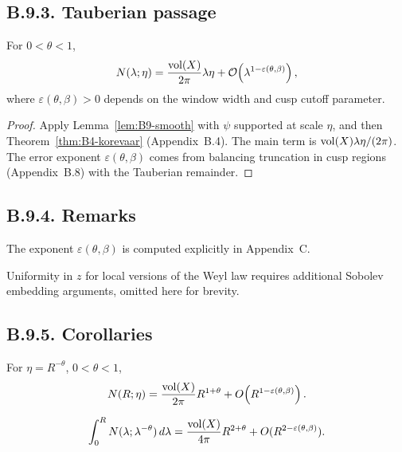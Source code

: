 \subsection*{B.9.3. Tauberian passage}

\begin{theorem}\label{thm:B9}
For $0<\theta<1$,
\begin{equation}\label{eq:B9}
N(\lambda;\eta)=\frac{\operatorname{vol}(X)}{2\pi}\lambda\eta
+\mathcal{O}\!\left(\lambda^{1-\varepsilon(\theta,\beta)}\right),
\end{equation}
where $\varepsilon(\theta,\beta)>0$ depends on the window width and cusp cutoff parameter.
\end{theorem}

\begin{proof}
Apply Lemma~\ref{lem:B9-smooth} with $\psi$ supported at scale $\eta$, and then Theorem~\ref{thm:B4-korevaar} (Appendix~B.4).
The main term is $\operatorname{vol}(X)\lambda\eta/(2\pi)$.
The error exponent $\varepsilon(\theta,\beta)$ comes from balancing truncation in cusp regions (Appendix~B.8) with the Tauberian remainder.
\end{proof}

\subsection*{B.9.4. Remarks}

\begin{remark}
The exponent $\varepsilon(\theta,\beta)$ is computed explicitly in Appendix~C.
\end{remark}

\begin{remark}
Uniformity in $z$ for local versions of the Weyl law requires additional Sobolev embedding arguments, omitted here for brevity.
\end{remark}

\subsection*{B.9.5. Corollaries}

\begin{corollary}\label{cor:B9}
For $\eta=R^{-\theta}$, $0<\theta<1$,
\[
N(R;\eta)=\frac{\operatorname{vol}(X)}{2\pi}R^{1+\theta}+O\!\left(R^{1-\varepsilon(\theta,\beta)}\right).
\]
\end{corollary}

\begin{corollary}\label{cor:B9-int}
\[
\int_0^R N(\lambda;\lambda^{-\theta})\,d\lambda
=\frac{\operatorname{vol}(X)}{4\pi}R^{2+\theta}+O(R^{2-\varepsilon(\theta,\beta)}).
\]
\end{corollary}

